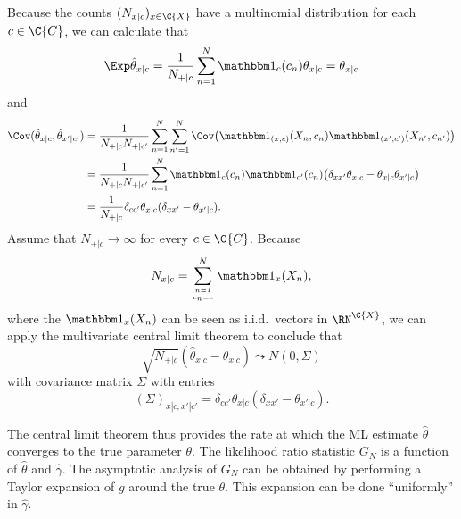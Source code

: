 Because the counts $(N_{x|c})_{x\in\C{X}}$ have a multinomial distribution for each $c\in\C{C}$, we can calculate that
$$\Exp \hat\theta_{x|c} = \frac{1}{N_{+|c}} \sum_{n=1}^N \I_c(c_n) \theta_{x|c} = \theta_{x|c}$$
and
\begin{equation*}\begin{split}
  \Cov(\hat \theta_{x|c}, \hat \theta_{x'|c'}) 
  & = \frac{1}{N_{+|c} N_{+|c'}} \sum_{n=1}^N \sum_{n'=1}^N \Cov\big( \I_{(x,c)}(X_n,c_n) \I_{(x',c')}(X_{n'},c_{n'}) \big) \\
  & = \frac{1}{N_{+|c} N_{+|c'}} \sum_{n=1}^N \I_c(c_n) \I_{c'}(c_{n}) \big( \delta_{xx'} \theta_{x|c} - \theta_{x|c} \theta_{x'|c} \big) \\
  & = \frac{1}{N_{+|c}} \delta_{cc'} \theta_{x|c} (\delta_{xx'} - \theta_{x'|c}).
\end{split}\end{equation*}
Assume that $N_{+|c} \to \infty$ for every $c \in \C{C}$.
Because
$$N_{x|c} = \sum_{n=1 \atop c_n=c}^N \I_{x}(X_n),$$
where the $\I_{x}(X_n)$ can be seen as i.i.d.\ vectors in $\RN^{\C{X}}$, we can apply the multivariate
central limit theorem to conclude that
  \begin{equation}\label{eq:multinomial_clt}
    \sqrt{N_{+|c}} (\hat\theta_{x|c} - \theta_{x|c}) \leadsto N(0,\Sigma)
  \end{equation}
with covariance matrix $\Sigma$ with entries
  \begin{equation}\label{eq:multinomial_cov}
    (\Sigma)_{x|c,x'|c'} = \delta_{cc'} \theta_{x|c} (\delta_{xx'} - \theta_{x'|c}).
  \end{equation}

The central limit theorem thus provides the rate at which the ML estimate $\hat \theta$ converges to the true parameter $\theta$.
The likelihood ratio statistic $G_N$ is a function of $\hat \theta$ and $\hat\gamma$. 
The asymptotic analysis of $G_N$ can be obtained by performing a Taylor expansion of $g$ around the true $\theta$. 
This expansion can be done ``uniformly'' in $\hat\gamma$.

